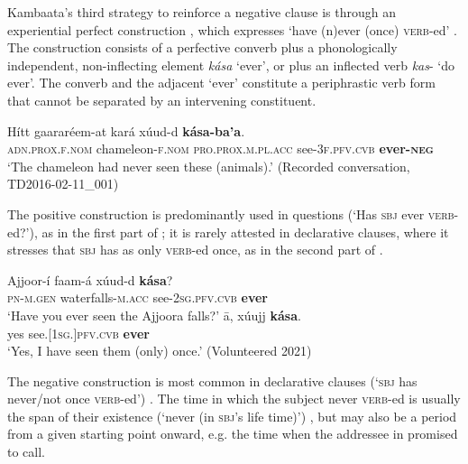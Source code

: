 \documentclass[output=paper,colorlinks,citecolor=brown,draftmode
]{langscibook}
\begin{document}
Kambaata's third strategy to reinforce a negative clause is through an experiential perfect construction \citep[327--331]{Treis2021}, which expresses ‘have (n)ever (once) \textsc{verb}-ed’ . The construction consists of a perfective converb plus a phonologically independent, non-inflecting element \textit{kása} ‘ever’, or plus an inflected verb \textit{kas}- ‘do ever’. The converb and the adjacent ‘ever’ constitute a periphrastic verb form that cannot be separated by an intervening constituent.

\ea\label{ex:treis:50} 
\gll Hítt					gaararéem-at 		  kará 					xúud-d 		\textbf{kása-ba’a}.\\
\textsc{\textsc{adn}.prox.f.nom}	chameleon-\textsc{f.nom}  \textsc{pro.prox.m.pl.acc}	see-\textsc{3f.pfv.cvb}	\textbf{ever-\textsc{neg}}\\
\glt ‘The chameleon had never seen these (animals).’ (Recorded conversation, TD2016-02-11\_001)
\z 

The positive construction is predominantly used in questions (‘Has \textsc{sbj} ever \textsc{verb}-ed?’), as in the first part of ; it is rarely attested in declarative clauses, where it stresses that \textsc{sbj} has as only \textsc{verb}-ed once, as in the second part of . 

\ea\label{ex:treis:add33} 
    \begin{xlist}[B: ]
        \gll Ajjoor-í    faam-á   xúud-d \textbf{kása}? \\ 
        \textsc{pn-m.gen}	waterfalls-\textsc{m.acc} see-\textsc{2sg.pfv.cvb}	\textbf{ever} \\ 
        \glt ‘Have you ever seen the Ajjoora falls?’
        \gll  {\A}ā,				xúujj \textbf{kása}.\\ %
        yes see.\textsc{[1sg.]pfv.cvb}	\textbf{ever}\\
        \glt ‘Yes, I have seen them (only) once.’ (Volunteered 2021)
    \end{xlist}
\z 
The negative construction is most common in declarative clauses (‘\textsc{sbj} has never/not once \textsc{verb}-ed’) . The time in which the subject never \textsc{verb}-ed is usually the span of their existence (‘never (in \textsc{sbj}’s life time)’) , but may also be a period from a given starting point onward, e.g. the time when the addressee in  promised to call.
\end{document}

